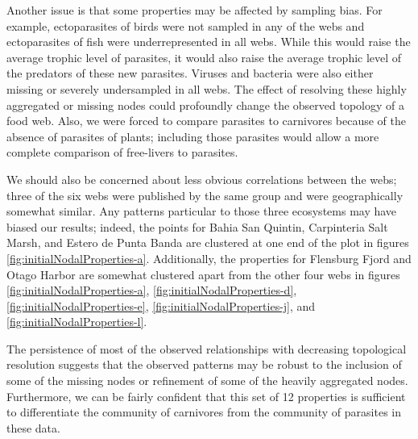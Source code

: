 \documentclass[../dissertation.tex]{subfiles}
\begin{document}
Another issue is that some properties may be affected by sampling bias. For
example, ectoparasites of birds were not sampled in any of the webs and 
ectoparasites of fish were underrepresented in all webs.
While this would raise the average trophic level of parasites, it would also
raise the average trophic level of the predators of these new parasites.
Viruses and bacteria were also either missing or severely undersampled in all
webs. The effect of resolving these highly aggregated or missing nodes could
profoundly change the observed topology of a food web. Also, we were forced
to compare parasites to carnivores because of the absence of parasites of
plants; including those parasites would allow a more complete comparison of
free-livers to parasites.

We should also be concerned about less obvious correlations between the webs;
three of the six webs were published by the same group and were geographically
somewhat similar. Any patterns particular to those three ecosystems may have
biased our results; indeed, the points for Bahia San Quintin, Carpinteria Salt
Marsh, and Estero de Punta Banda are clustered at one end of the plot in
figures \ref{fig:initialNodalProperties-a}. Additionally, the properties for
Flensburg Fjord and Otago Harbor are somewhat clustered apart from the other
four webs in figures \ref{fig:initialNodalProperties-a},
\ref{fig:initialNodalProperties-d}, \ref{fig:initialNodalProperties-e},
\ref{fig:initialNodalProperties-j}, and \ref{fig:initialNodalProperties-l}.


The persistence of most of the observed relationships with decreasing
topological resolution suggests that the observed patterns may be robust to the
inclusion of some of the missing nodes or refinement of some of the heavily
aggregated nodes.  Furthermore, we can be fairly
confident that this set of 12 properties is sufficient to differentiate the
community of carnivores from the community of parasites in these data.
\end{document}
